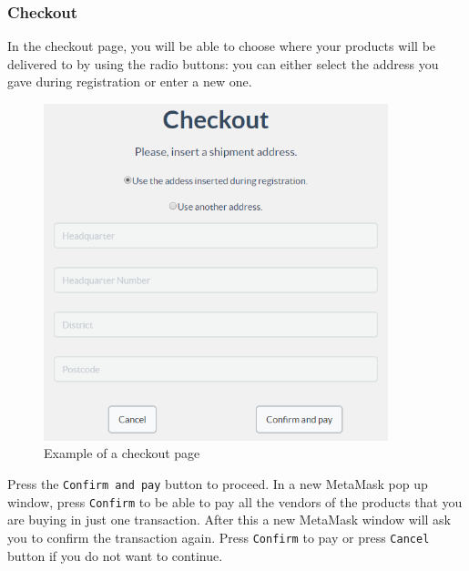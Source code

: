 		\subsubsection{Checkout}
		In the checkout page, you will be able to choose where your products 
		will be delivered to by using the radio buttons: you can either select 
		the address you gave during registration or enter a new one.
	\begin{figure}[H]
		\includegraphics[width=10cm]{res/images/checkout.png}
		\centering
		\caption{Example of a checkout page}
	\end{figure}
	\noindent Press the \texttt{Confirm and pay} button to proceed. In a new 
	MetaMask\glo{} pop up window, press \texttt{Confirm} to be able to pay all the 
	vendors of the products that you are buying in just one transaction. After this 
	a new MetaMask\glo{} window will ask you to confirm the transaction again. Press \texttt{Confirm} to pay or press \texttt{Cancel}
	button if you do not want to continue.
